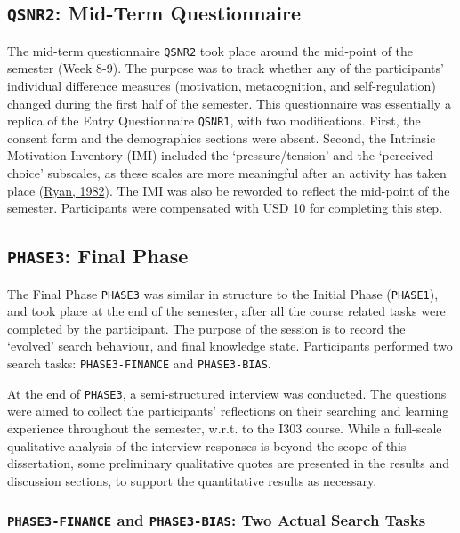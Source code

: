 \documentclass[letterpaper, nobind]{templates/ociamthesis}
\begin{document}
\hypertarget{sec-method-qsnr2}{%
\subsection{\texorpdfstring{\texttt{QSNR2}: Mid-Term Questionnaire}{QSNR2: Mid-Term Questionnaire}}\label{sec-method-qsnr2}}

The mid-term questionnaire \texttt{QSNR2} took place around the mid-point of the semester (Week 8-9).
The purpose was to track whether any of the participants' individual difference measures (motivation, metacognition, and self-regulation) changed during the first half of the semester.
This questionnaire was essentially a replica of the Entry Questionnaire \texttt{QSNR1}, with two modifications. First, the consent form and the demographics sections were absent.
Second, the Intrinsic Motivation Inventory (IMI) included the `pressure/tension' and the `perceived choice' subscales, as these scales are more meaningful after an activity has taken place (\protect\hyperlink{ref-ryan1982control}{Ryan, 1982}).
The IMI was also be reworded to reflect the mid-point of the semester.
Participants were compensated with USD 10 for completing this step.

\hypertarget{sec-method-phase3}{%
\subsection{\texorpdfstring{\texttt{PHASE3}: Final Phase}{PHASE3: Final Phase}}\label{sec-method-phase3}}

The Final Phase \texttt{PHASE3} was similar in structure to the Initial Phase (\texttt{PHASE1}), and took place at the end of the semester, after all the course related tasks were completed by the participant. The purpose of the session is to record the `evolved' search behaviour, and final knowledge state.
Participants performed two search tasks: \texttt{PHASE3-FINANCE} and \texttt{PHASE3-BIAS}.

At the end of \texttt{PHASE3}, a semi-structured interview was conducted.
The questions were aimed to collect the participants' reflections on their searching and learning experience throughout the semester, w.r.t. to the I303 course.
While a full-scale qualitative analysis of the interview responses is beyond the scope of this dissertation, some preliminary qualitative quotes are presented in the results and discussion sections, to support the quantitative results as necessary.

\hypertarget{phase3-finance-and-phase3-bias-two-actual-search-tasks}{%
\subsubsection{\texorpdfstring{\texttt{PHASE3-FINANCE} and \texttt{PHASE3-BIAS}: Two Actual Search Tasks}{PHASE3-FINANCE and PHASE3-BIAS: Two Actual Search Tasks}}\label{phase3-finance-and-phase3-bias-two-actual-search-tasks}}
\end{document}
